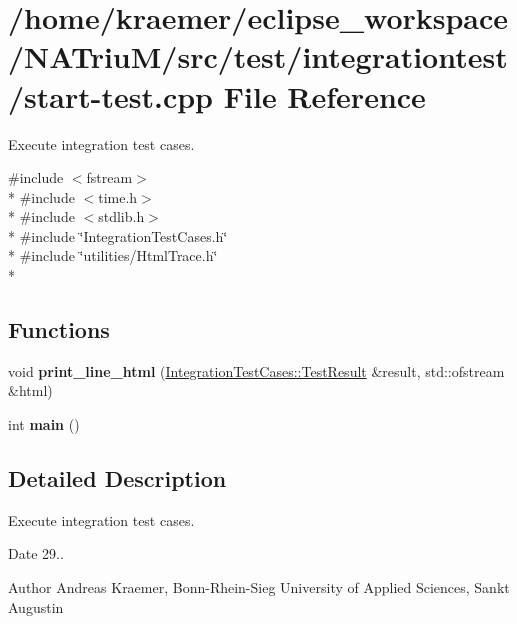 \hypertarget{start-test_8cpp}{\section{/home/kraemer/eclipse\-\_\-workspace/\-N\-A\-Triu\-M/src/test/integrationtest/start-\/test.cpp File Reference}
\label{start-test_8cpp}
}


Execute integration test cases.  


{\ttfamily \#include $<$fstream$>$}\\*
{\ttfamily \#include $<$time.\-h$>$}\\*
{\ttfamily \#include $<$stdlib.\-h$>$}\\*
{\ttfamily \#include \char`\"{}Integration\-Test\-Cases.\-h\char`\"{}}\\*
{\ttfamily \#include \char`\"{}utilities/\-Html\-Trace.\-h\char`\"{}}\\*
\subsection*{Functions}
\begin{DoxyCompactItemize}
\item 
\hypertarget{start-test_8cpp_a363deb579434784ee372fb2d37def478}{void {\bfseries print\-\_\-line\-\_\-html} (\hyperlink{structnatrium_1_1IntegrationTestCases_1_1TestResult}{Integration\-Test\-Cases\-::\-Test\-Result} \&result, std\-::ofstream \&html)}\label{start-test_8cpp_a363deb579434784ee372fb2d37def478}

\item 
\hypertarget{start-test_8cpp_ae66f6b31b5ad750f1fe042a706a4e3d4}{int {\bfseries main} ()}\label{start-test_8cpp_ae66f6b31b5ad750f1fe042a706a4e3d4}

\end{DoxyCompactItemize}


\subsection{Detailed Description}
Execute integration test cases. \begin{DoxyDate}{Date}
29.. 
\end{DoxyDate}
\begin{DoxyAuthor}{Author}
Andreas Kraemer, Bonn-\/\-Rhein-\/\-Sieg University of Applied Sciences, Sankt Augustin 
\end{DoxyAuthor}
